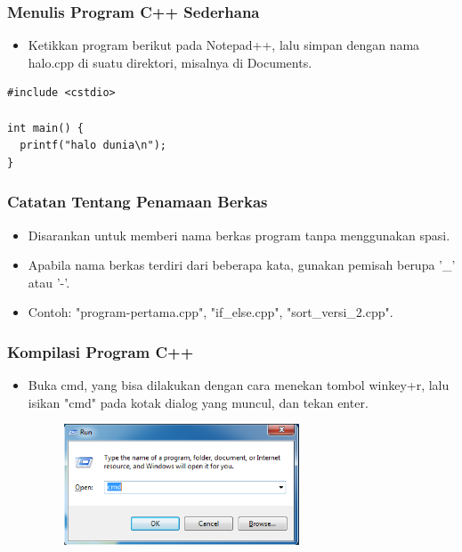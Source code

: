 \begin{frame}[fragile]
\frametitle{Menulis Program C++ Sederhana}
\begin{itemize}
  \item Ketikkan program berikut pada Notepad++, lalu simpan dengan nama halo.cpp di suatu direktori, misalnya di Documents.
\end{itemize}
\begin{lstlisting}
#include <cstdio>

int main() {
  printf("halo dunia\n");
}
\end{lstlisting}
\end{frame}

\begin{frame}[fragile]
\frametitle{Catatan Tentang Penamaan Berkas}
\begin{itemize}
  \item Disarankan untuk memberi nama berkas program tanpa menggunakan spasi.
  \item Apabila nama berkas terdiri dari beberapa kata, gunakan pemisah berupa '\_' atau '-'.
  \item Contoh: "program-pertama.cpp", "if\_else.cpp", "sort\_versi\_2.cpp".
\end{itemize}
\end{frame}

\begin{frame}
\frametitle{Kompilasi Program C++}
\begin{itemize}
  \item Buka cmd, yang bisa dilakukan dengan cara menekan tombol winkey+r, lalu isikan "cmd" pada kotak dialog yang muncul, dan tekan enter.
  \begin{figure}
    \includegraphics[width=7cm]{asset/run.png}
  \end{figure}
\end{itemize}
\end{frame}

